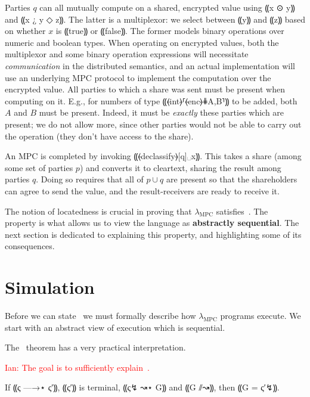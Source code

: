 \documentclass{report}
\newcommand{\mpc}{\ensuremath{\lambda_{\mathrm{MPC}}}\xspace}
\newcommand{\ins}[1]{\textcolor{red}{Ian: #1}}
\begin{document}
Parties $q$ can all mutually compute on a shared, encrypted value
using ⸨x ⊙ y⸩ and ⸨x ¿ y ◇ z⸩.  The latter is a
multiplexor: we select between ⸨y⸩ and ⸨z⸩ based on whether $x$ is ⸨true⸩ or
⸨false⸩. The former models binary operations over numeric and boolean types.
When operating on encrypted values, both the multiplexor and some binary
operation expressions will necessitate \emph{communication} in the
distributed semantics, and an actual implementation will use an
underlying MPC protocol to implement the computation over the encrypted value.
All parties to which a share was sent must be present when computing on it. E.g., for numbers of type
⸨⦑int⦒⸢⦑enc⦒⋕{A,B}⸣⸩ to be added, both $A$ and $B$ must be
present. Indeed, it must be \emph{exactly} these parties which are
present; we do not allow more, since other parties would not be
able to carry out the operation (they don't have access to the
share).

An MPC is completed by invoking ⸨⦑declassify⦒[q]␣x⸩. This takes a share
(among some set of parties $p$) and converts it to cleartext,
sharing the result among parties $q$. Doing so requires that all of
$p \cup q$ are present so that the shareholders
can agree to send the value, and the result-receivers are ready to
receive it.

The notion of locatedness is crucial in proving that \mpc satisfies~.
The~ property is what allows us to view the language as \textbf{abstractly sequential}. The
next section is dedicated to explaining this property, and highlighting some of its consequences.

\section{Simulation}
\label{sec:lam-mpc-simulation}

Before we can state~ we must formally describe how \mpc programs execute. We start with
an abstract view of execution which is sequential.

The~ theorem has a very practical interpretation.

\ins{The goal is to sufficiently explain~\nameref{thm:mpc-simulation}.}

\begin{theorem} \label{thm:mpc-simulation}
  If ⸨ς —→⋆ ς′⸩, ⸨ς′⸩ is terminal, ⸨ς↯ ↝⋆ G⸩ and ⸨G ⫽↝⸩, then ⸨G = ς′↯⸩.
\end{theorem}
\end{document}

